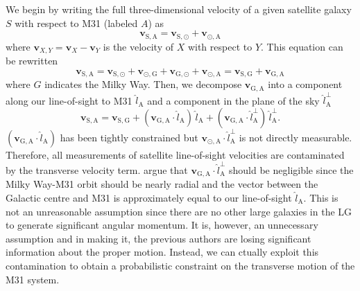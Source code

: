 \documentclass[preprint]{aastex}
\newcommand{\eqlabel}[1]{\label{eq:#1}}
\newcommand{\bvec}[1]{\ensuremath{\boldsymbol{#1}}}
\newcommand{\vrel}[2]{\ensuremath{\bvec{v}_{\mathrm{#1},\mathrm{#2}}}}
\begin{document}
We begin by writing the full three-dimensional velocity of a given satellite
galaxy $S$ with respect to M31 (labeled $A$) as
\begin{equation}
    \eqlabel{vdm1}
    \vrel{S}{A} = \vrel{S}{\odot} + \vrel{\odot}{A}
\end{equation}
where $\mathbf{v}_{X,Y} = \mathbf{v}_{X}-\mathbf{v}_Y$ is the velocity of $X$
with respect to $Y$.  This equation can be rewritten
\begin{equation}
    \mathbf{v}_\mathrm{S,A} = \mathbf{v}_{\mathrm{S},\odot}
    + \mathbf{v}_{\odot,\mathrm{G}} + \mathbf{v}_{\mathrm{G},\odot}
    + \mathbf{v}_{\odot,\mathrm{A}} = \mathbf{v}_{\mathrm{S,G}}
    + \mathbf{v}_{\mathrm{G,A}}
\end{equation}
where $G$ indicates the Milky Way.  Then, we decompose $\mathbf{v}_{\mathrm{G,A}}$
into a component along our line-of-sight to M31 $\hat{l}_\mathrm{A}$ and a
component in the plane of the sky $\hat{l}_\mathrm{A}^\perp$
\begin{equation}
    \mathbf{v}_\mathrm{S,A} = \mathbf{v}_{\mathrm{S,G}} + (\mathbf{v}_{\mathrm{G,A}}
    \cdot \hat{l}_\mathrm{A}) \, \hat{l}_\mathrm{A} + (\mathbf{v}_{\mathrm{G,A}}
    \cdot \hat{l}_\mathrm{A}^\perp) \, \hat{l}_\mathrm{A}^\perp.
\end{equation}
$(\mathbf{v}_{\mathrm{G,A}} \cdot \hat{l}_\mathrm{A})$ has been tightly
constrained \citep{Courteau:1999} but
$\mathbf{v}_{\odot,\mathrm{A}} \cdot \hat{l}_\mathrm{A}^\perp$ is not directly
measurable. Therefore, all measurements of satellite line-of-sight velocities are
contaminated by the transverse velocity term.  \citet{ew} argue that
$\mathbf{v}_{\mathrm{G,A}} \cdot \hat{l}_\mathrm{A}^\perp$ should be negligible
since the Milky Way-M31 orbit should be nearly radial and the vector between the
Galactic centre and M31 is approximately equal to our line-of-sight
$\hat{l}_\mathrm{A}$.  This is not an unreasonable assumption since there are
no other large galaxies in the LG to generate significant angular momentum.
It is, however, an unnecessary assumption and in making it, the previous authors
are losing significant information about the proper motion.  Instead, we can
ctually exploit this contamination to obtain a probabilistic constraint on the
transverse motion of the M31 system.
\end{document}
